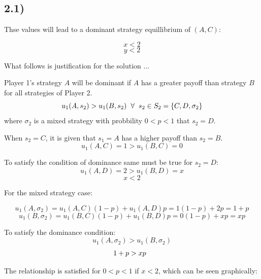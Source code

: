 \documentclass[a4paper,11pt]{article}
\begin{document}
\subsection*{2.1)}

Thse values will lead to a dominant strategy equillibrium of $(A, C)$:

\[ x < 2 \]
\[ y < 2 \]

What follows is justification for the solution ... \newline

Player 1's strategy $A$ will be dominant if $A$ has a greater payoff than strategy $B$ for all strategies of Player 2.
\[ u_1(A, s_2) > u_1(B, s_2) \hspace{2mm} \forall \hspace{2mm} s_2 \in S_2 = \{ C, D, \sigma_2 \} \]
where $\sigma_2$ is a mixed strategy with probbility $0 < p < 1$ that $s_2 = D$.\newline 

When $s_2 = C$, it is given that $s_1 = A$ has a higher payoff than $s_2 = B$.
\[ u_1(A, C) = 1 > u_1(B, C) = 0 \]

To satisfy the condition of dominance same must be true for $s_2 = D$:
\[ u_1(A, D) = 2 > u_1(B, D) = x \]
\[ x < 2 \]

For the mixed strategy case:

\[ u_1(A, \sigma_2) = u_1(A, C)(1 - p) + u_1(A, D)p = 1(1 - p) + 2p = 1 + p \]
\[ u_1(B, \sigma_2) = u_1(B, C)(1 - p) + u_1(B, D)p = 0(1 - p) + xp = xp \]

To satisfy the dominance condition:
\[ u_1(A, \sigma_2) > u_1(B, \sigma_2)\]
\[ 1 + p > xp \hspace{2mm} \]

The relationship is satisfied for $0 < p < 1$ if $x < 2$, which can be seen graphically:
\end{document}
